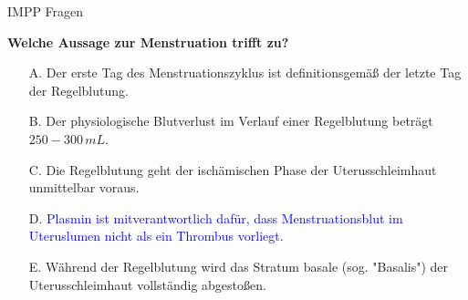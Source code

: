 \documentclass{beamer}
\begin{document}
\begin{frame}{IMPP Fragen}
    
\textbf{Welche Aussage zur Menstruation trifft zu?} \\[0.2 cm]

\begin{itemize}
\item[A.] Der erste Tag des Menstruationszyklus ist definitionsgemäß der letzte Tag der Regelblutung.
\item[B.] Der physiologische Blutverlust im Verlauf einer Regelblutung beträgt \(250-300\,mL\).
\item[C.] Die Regelblutung geht der ischämischen Phase der Uterusschleimhaut unmittelbar voraus. 
\item[D.] \textcolor{blue}{Plasmin ist mitverantwortlich dafür, dass Menstruationsblut im Uteruslumen nicht als ein Thrombus vorliegt.} %
\item[E.] Während der Regelblutung wird das Stratum basale (sog. "Basalis") der Uterusschleimhaut vollständig abgestoßen.

\end{itemize}

\end{frame}







\end{document}
